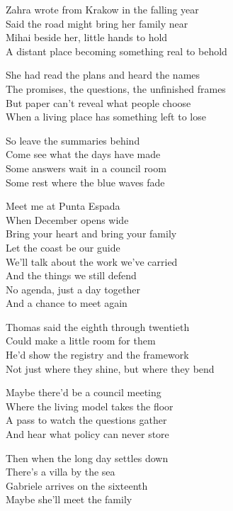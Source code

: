 \begin{lyrics}
Zahra wrote from Krakow in the falling year\\
Said the road might bring her family near\\
Mihai beside her, little hands to hold\\
A distant place becoming something real to behold

She had read the plans and heard the names\\
The promises, the questions, the unfinished frames\\
But paper can't reveal what people choose\\
When a living place has something left to lose

So leave the summaries behind\\
Come see what the days have made\\
Some answers wait in a council room\\
Some rest where the blue waves fade

Meet me at Punta Espada\\
When December opens wide\\
Bring your heart and bring your family\\
Let the coast be our guide\\
We'll talk about the work we've carried\\
And the things we still defend\\
No agenda, just a day together\\
And a chance to meet again

Thomas said the eighth through twentieth\\
Could make a little room for them\\
He'd show the registry and the framework\\
Not just where they shine, but where they bend

Maybe there'd be a council meeting\\
Where the living model takes the floor\\
A pass to watch the questions gather\\
And hear what policy can never store

Then when the long day settles down\\
There's a villa by the sea\\
Gabriele arrives on the sixteenth\\
Maybe she'll meet the family


\end{lyrics}
